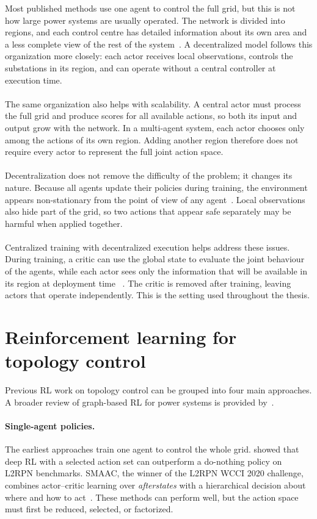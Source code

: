 Most published methods use one agent to control the full grid, but this is not
how large power systems are usually operated. The network is divided into
regions, and each control centre has detailed information about its own area
and a less complete view of the rest of the system~\cite{viebahn2022ai}. A
decentralized model follows this organization more closely: each actor receives
local observations, controls the substations in its region, and can operate
without a central controller at execution time.
\\
\\
The same organization also helps with scalability. A central actor must process
the full grid and produce scores for all available actions, so both its input
and output grow with the network. In a multi-agent system, each actor chooses
only among the actions of its own region. Adding another region therefore does
not require every actor to represent the full joint action space.
\\
\\
Decentralization does not remove the difficulty of the problem; it changes its
nature. Because all agents update their policies during training, the
environment appears non-stationary from the point of view of any
agent~\cite{tan1993independent}. Local observations also hide part of the grid,
so two actions that appear safe separately may be harmful when applied together.
\\
\\
Centralized training with decentralized execution helps address these issues.
During training, a critic can use the global state to evaluate the joint
behaviour of the agents, while each actor sees only the information that will be
available in its region at deployment time
~\cite{lowe2017maddpg,yu2022mappo}. The critic is removed after training, leaving
actors that operate independently. This is the setting used throughout the
thesis.

\section{Reinforcement learning for topology control}
\label{sec:intro-related-work}

Previous RL work on topology control can be grouped into four main approaches.
A broader review of graph-based RL for power systems is provided
by~\textcite{hassouna2024survey}.

\paragraph{Single-agent policies.}
The earliest approaches train one agent to control the whole grid.
\textcite{subramanian2021exploring} showed that deep RL with a selected action
set can outperform a do-nothing policy on L2RPN benchmarks. SMAAC, the winner
of the L2RPN WCCI 2020 challenge, combines actor--critic learning over
\emph{afterstates} with a hierarchical decision about where and how to
act~\cite{yoon2021smaac}. These methods can perform well, but the action space
must first be reduced, selected, or factorized.

